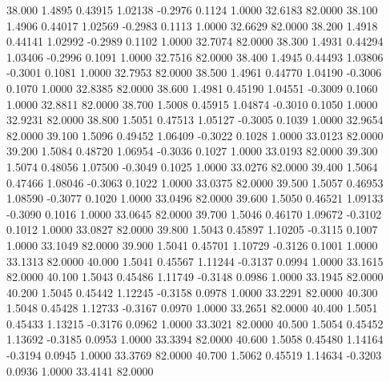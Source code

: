   38.000   1.4895   0.43915   1.02138  -0.2976   0.1124   1.0000  32.6183  82.0000
  38.100   1.4906   0.44017   1.02569  -0.2983   0.1113   1.0000  32.6629  82.0000
  38.200   1.4918   0.44141   1.02992  -0.2989   0.1102   1.0000  32.7074  82.0000
  38.300   1.4931   0.44294   1.03406  -0.2996   0.1091   1.0000  32.7516  82.0000
  38.400   1.4945   0.44493   1.03806  -0.3001   0.1081   1.0000  32.7953  82.0000
  38.500   1.4961   0.44770   1.04190  -0.3006   0.1070   1.0000  32.8385  82.0000
  38.600   1.4981   0.45190   1.04551  -0.3009   0.1060   1.0000  32.8811  82.0000
  38.700   1.5008   0.45915   1.04874  -0.3010   0.1050   1.0000  32.9231  82.0000
  38.800   1.5051   0.47513   1.05127  -0.3005   0.1039   1.0000  32.9654  82.0000
  39.100   1.5096   0.49452   1.06409  -0.3022   0.1028   1.0000  33.0123  82.0000
  39.200   1.5084   0.48720   1.06954  -0.3036   0.1027   1.0000  33.0193  82.0000
  39.300   1.5074   0.48056   1.07500  -0.3049   0.1025   1.0000  33.0276  82.0000
  39.400   1.5064   0.47466   1.08046  -0.3063   0.1022   1.0000  33.0375  82.0000
  39.500   1.5057   0.46953   1.08590  -0.3077   0.1020   1.0000  33.0496  82.0000
  39.600   1.5050   0.46521   1.09133  -0.3090   0.1016   1.0000  33.0645  82.0000
  39.700   1.5046   0.46170   1.09672  -0.3102   0.1012   1.0000  33.0827  82.0000
  39.800   1.5043   0.45897   1.10205  -0.3115   0.1007   1.0000  33.1049  82.0000
  39.900   1.5041   0.45701   1.10729  -0.3126   0.1001   1.0000  33.1313  82.0000
  40.000   1.5041   0.45567   1.11244  -0.3137   0.0994   1.0000  33.1615  82.0000
  40.100   1.5043   0.45486   1.11749  -0.3148   0.0986   1.0000  33.1945  82.0000
  40.200   1.5045   0.45442   1.12245  -0.3158   0.0978   1.0000  33.2291  82.0000
  40.300   1.5048   0.45428   1.12733  -0.3167   0.0970   1.0000  33.2651  82.0000
  40.400   1.5051   0.45433   1.13215  -0.3176   0.0962   1.0000  33.3021  82.0000
  40.500   1.5054   0.45452   1.13692  -0.3185   0.0953   1.0000  33.3394  82.0000
  40.600   1.5058   0.45480   1.14164  -0.3194   0.0945   1.0000  33.3769  82.0000
  40.700   1.5062   0.45519   1.14634  -0.3203   0.0936   1.0000  33.4141  82.0000
